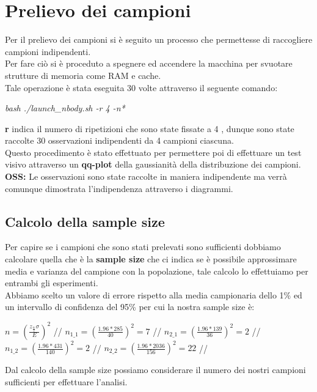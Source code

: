 \section{Prelievo dei campioni}
Per il prelievo dei campioni si è seguito un processo che permettesse di raccogliere campioni indipendenti.\\
Per fare ciò si è proceduto a spegnere ed accendere la macchina per svuotare strutture di memoria come RAM e cache.\\
Tale operazione è stata eseguita 30 volte attraverso il seguente comando:
\begin{center}
    \textit{bash ./launch\_nbody.sh -r 4 -n*}
\end{center}
\textbf{r} indica il numero di ripetizioni che sono state fissate a 4 , dunque sono state raccolte 30 osservazioni indipendenti da 4 campioni ciascuna.\\
Questo procedimento è stato effettuato per permettere poi di effettuare un test visivo attraverso un \textbf{qq-plot} della gaussianità della distribuzione dei campioni.\\
\textbf{OSS: }Le osservazioni sono state raccolte in maniera indipendente ma verrà comunque dimostrata l'indipendenza attraverso i diagrammi.\\
\subsection{Calcolo della sample size}
Per capire se i campioni che sono stati prelevati sono sufficienti dobbiamo calcolare quella che è la \textbf{sample size} che ci indica se è possibile approssimare media e varianza del campione con la popolazione, tale calcolo lo effettuiamo per entrambi gli esperimenti.\\
Abbiamo scelto un valore di errore rispetto alla media campionaria dello 1\% ed un intervallo di confidenza del 95\% per cui la nostra sample size è:\\
\begin{center}
    
        $n = (\frac{z_{\frac{\alpha}{2}} \sigma}{E})^2$ //
        $n_{1\_1} = (\frac{1.96*285}{40})^2 = 7$ //
        $n_{2\_1} = (\frac{1.96*139}{36})^2 = 2$ //
        $n_{1\_2} = (\frac{1.96*431}{140})^2 = 2$ //
        $n_{2\_2} = (\frac{1.96*2036}{156})^2 = 22$ //
    
\end{center}
Dal calcolo della sample size possiamo considerare il numero dei nostri campioni sufficienti per effettuare l'analisi.\\

